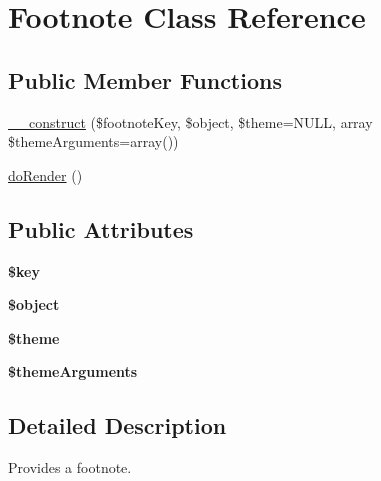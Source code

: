 \hypertarget{class_footnote}{\section{Footnote Class Reference}
\label{class_footnote}
}
\subsection*{Public Member Functions}
\begin{DoxyCompactItemize}
\item 
\hyperlink{class_footnote_aa5032f40a06d8e51f25652b4c2c66527}{\-\_\-\-\_\-construct} (\$footnote\-Key, \$object, \$theme=N\-U\-L\-L, array \$theme\-Arguments=array())
\item 
\hyperlink{class_footnote_ab0071956a83a038f780a32eddc24e48a}{do\-Render} ()
\end{DoxyCompactItemize}
\subsection*{Public Attributes}
\begin{DoxyCompactItemize}
\item 
\hypertarget{class_footnote_af3d703e5ad010f2b0c349e09591e1d77}{{\bfseries \$key}}\label{class_footnote_af3d703e5ad010f2b0c349e09591e1d77}

\item 
\hypertarget{class_footnote_ac35f9a9b701106840c72eade79ac1c70}{{\bfseries \$object}}\label{class_footnote_ac35f9a9b701106840c72eade79ac1c70}

\item 
\hypertarget{class_footnote_aaa7364378c8e472356858a7f45b12942}{{\bfseries \$theme}}\label{class_footnote_aaa7364378c8e472356858a7f45b12942}

\item 
\hypertarget{class_footnote_a0b0d69a081078cb52ac79a916d70691a}{{\bfseries \$theme\-Arguments}}\label{class_footnote_a0b0d69a081078cb52ac79a916d70691a}

\end{DoxyCompactItemize}


\subsection{Detailed Description}
Provides a footnote. 

